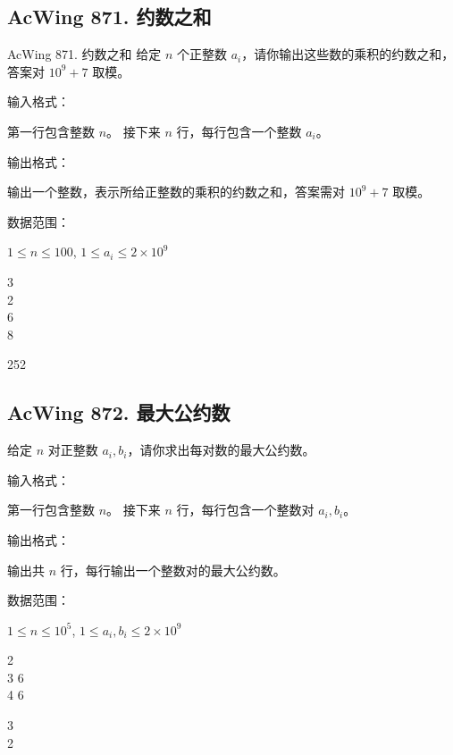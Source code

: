 \subsection{AcWing 871. 约数之和}
\begin{titledbox}{AcWing 871. 约数之和}
    给定 $n$ 个正整数 $a_i$，请你输出这些数的乘积的约数之和，答案对 $10^9+7$ 取模。

    输入格式：

    第一行包含整数 $n$。 接下来 $n$ 行，每行包含一个整数 $a_i$。

    输出格式：

    输出一个整数，表示所给正整数的乘积的约数之和，答案需对 $10^9+7$ 取模。

    数据范围：

    $1 \le n \le 100$, $1 \le a_i \le 2 \times 10^9$

    \begin{inputblock}
        3 \\
        2 \\
        6 \\
        8
    \end{inputblock}
    \begin{outputblock}
        252
    \end{outputblock}
\end{titledbox}

\subsection{AcWing 872. 最大公约数}
\begin{titledbox}
    给定 $n$ 对正整数 $a_i, b_i$，请你求出每对数的最大公约数。

    输入格式：

    第一行包含整数 $n$。 接下来 $n$ 行，每行包含一个整数对 $a_i,b_i$。

    输出格式：

    输出共 $n$ 行，每行输出一个整数对的最大公约数。

    数据范围：

    $1 \le n \le 10^5$, $1 \le a_i, b_i \le 2 \times 10^9$

    \begin{inputblock}
        2 \\
        3 6 \\
        4 6
    \end{inputblock}
    \begin{outputblock}
        3 \\
        2
    \end{outputblock}
\end{titledbox}


